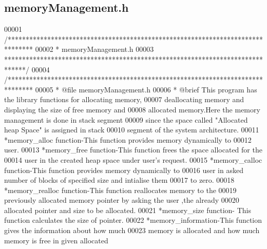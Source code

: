 \hypertarget{memory_management_8h_source}{}\subsection{memory\+Management.\+h}
\label{memory_management_8h_source}

\begin{DoxyCode}
00001 \textcolor{comment}{/*******************************************************************************                           
                 }
00002 \textcolor{comment}{ *                        memoryManagement.h}
00003 \textcolor{comment}{ ******************************************************************************/}
00004 \textcolor{comment}{/*******************************************************************************}
00005 \textcolor{comment}{ * @file   memoryManagement.h}
00006 \textcolor{comment}{ * @brief  This program has the library functions for allocating memory,}
00007 \textcolor{comment}{           deallocating memory and displaying the size of free memory and }
00008 \textcolor{comment}{           allocated memory.Here the memory management is done in stack segment}
00009 \textcolor{comment}{           since the space called "Allocated heap Space" is assigned in stack}
00010 \textcolor{comment}{           segment of the system architecture. }
00011 \textcolor{comment}{          *memory\_alloc function-This function provides memory dynamically to }
00012 \textcolor{comment}{           user.  }
00013 \textcolor{comment}{          *memory\_free function-This function frees the space allocated for the}
00014 \textcolor{comment}{           user in the created heap space under user's request.}
00015 \textcolor{comment}{          *memory\_calloc function-This function provides memory dynamically to }
00016 \textcolor{comment}{           user in asked number of blocks of specified size and intialise them }
00017 \textcolor{comment}{           to zero.}
00018 \textcolor{comment}{          *memory\_realloc function-This function reallocates memory to the }
00019 \textcolor{comment}{           previously allocated memory pointer by asking the user ,the already }
00020 \textcolor{comment}{           allocated pointer and size to be allocated.}
00021 \textcolor{comment}{          *memory\_size function- This function calculates the size of pointer.}
00022 \textcolor{comment}{          *memory\_information-This function gives the information about how much}
00023 \textcolor{comment}{           memory is allocated and how much memory is free in given allocated}

\end{DoxyCode}
